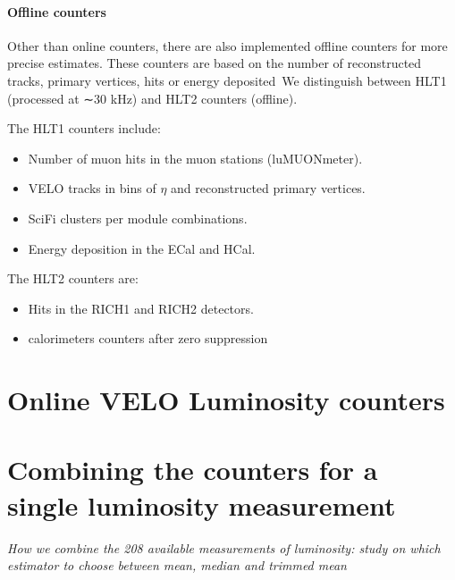\paragraph{Offline counters} 
Other than online counters, there are also implemented offline counters for more precise estimates.
These counters are based on the number of reconstructed tracks, primary vertices, hits or energy deposited\
We distinguish between HLT1 (processed at ∼30 kHz) and HLT2 counters (offline).

The HLT1 counters include:
\begin{itemize}
   \item Number of muon hits in the muon stations (luMUONmeter).
   \item  VELO tracks in bins of $\eta$ and reconstructed primary vertices.
   \item SciFi clusters per module combinations.
   \item Energy deposition in the ECal and HCal.
\end{itemize}
The HLT2 counters are:
\begin{itemize}
    \item Hits in the RICH1 and RICH2 detectors.
    \item calorimeters counters after zero suppression 
\end{itemize}

\section{Online VELO Luminosity counters}

\section{Combining the counters for a single luminosity measurement}
\textit{How we combine the 208 available measurements of luminosity: study on which estimator to choose between mean, median and trimmed mean}